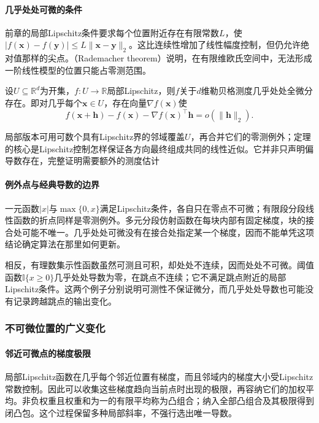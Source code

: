 \paragraph{几乎处处可微的条件}

前章的局部Lipschitz条件要求每个位置附近存在有限常数$L$，使$|f(\bm x)-f(\bm y)|\leq L\lVert\bm x-\bm y\rVert_2$。这比连续性增加了线性幅度控制，但仍允许绝对值那样的尖点。（Rademacher theorem）说明，在有限维欧氏空间中，无法形成一阶线性模型的位置只能占零测范围。
\begin{theorem}[Rademacher定理]
\label{thm:measurable-rademacher}
设$U\subseteq\mathbb R^d$为开集，$f:U\to\mathbb R$局部Lipschitz，则$f$关于$d$维勒贝格测度几乎处处全微分存在。即对几乎每个$\bm x\in U$，存在向量$\nabla f(\bm x)$使
\[
 f(\bm x+\bm h)-f(\bm x)-\nabla f(\bm x)^\top\bm h=o(\lVert\bm h\rVert_2).
\]
\end{theorem}
局部版本可用可数个具有Lipschitz界的邻域覆盖$U$，再合并它们的零测例外；定理的核心是Lipschitz控制怎样保证各方向最终组成共同的线性近似。它并非只声明偏导数存在，完整证明需要额外的测度估计

\paragraph{例外点与经典导数的边界}

一元函数$|x|$与$\max\{0,x\}$满足Lipschitz条件，各自只在零点不可微；有限段分段线性函数的折点同样是零测例外。多元分段仿射函数在每块内部有固定梯度，块的接合处可能不唯一。几乎处处可微没有在接合处指定某一个梯度，因而不能单凭这项结论确定算法在那里如何更新。

相反，有理数集示性函数虽然可测且可积，却处处不连续，因而处处不可微。阈值函数$\mathbb I\{x\geq0\}$几乎处处导数为零，在跳点不连续；它不满足跳点附近的局部Lipschitz条件。这两个例子分别说明可测性不保证微分，而几乎处处导数也可能没有记录跨越跳点的输出变化。

\subsubsection{不可微位置的广义变化}
\label{sec:analysis-nonsmooth-surrogate-gradient}
\paragraph{邻近可微点的梯度极限}

局部Lipschitz函数在几乎每个邻近位置有梯度，而且邻域内的梯度大小受Lipschitz常数控制。因此可以收集这些梯度趋向当前点时出现的极限，再容纳它们的加权平均。非负权重且权重和为一的有限平均称为凸组合；纳入全部凸组合及其极限得到闭凸包。这个过程保留多种局部斜率，不强行选出唯一导数。

